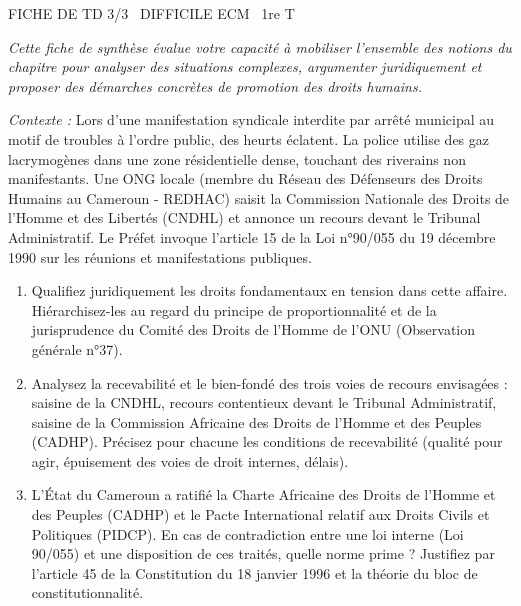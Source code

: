 \documentclass[11pt]{article}
\begin{document}
\begin{tcolorbox}[enhanced,colback=popink,colframe=popink,arc=10pt,boxrule=0pt,left=12pt,right=12pt,top=9pt,bottom=9pt]
{\color{white}\popxbold\small FICHE DE TD 3/3 \textbullet\ DIFFICILE \hfill ECM \textbullet\ 1re T\par}
\end{tcolorbox}
\vspace{4pt}
\noindent \textit{Cette fiche de synthèse évalue votre capacité à mobiliser l'ensemble des notions du chapitre pour analyser des situations complexes, argumenter juridiquement et proposer des démarches concrètes de promotion des droits humains.}

\begin{exercice}
    \textit{Contexte :} Lors d'une manifestation syndicale interdite par arrêté municipal au motif de troubles à l'ordre public, des heurts éclatent. La police utilise des gaz lacrymogènes dans une zone résidentielle dense, touchant des riverains non manifestants. Une ONG locale (membre du Réseau des Défenseurs des Droits Humains au Cameroun - REDHAC) saisit la Commission Nationale des Droits de l'Homme et des Libertés (CNDHL) et annonce un recours devant le Tribunal Administratif. Le Préfet invoque l'article 15 de la Loi n°90/055 du 19 décembre 1990 sur les réunions et manifestations publiques.
    \begin{enumerate}
        \item Qualifiez juridiquement les droits fondamentaux en tension dans cette affaire. Hiérarchisez-les au regard du principe de proportionnalité et de la jurisprudence du Comité des Droits de l'Homme de l'ONU (Observation générale n°37).
        \item Analysez la recevabilité et le bien-fondé des trois voies de recours envisagées : saisine de la CNDHL, recours contentieux devant le Tribunal Administratif, saisine de la Commission Africaine des Droits de l'Homme et des Peuples (CADHP). Précisez pour chacune les conditions de recevabilité (qualité pour agir, épuisement des voies de droit internes, délais).
        \item L'État du Cameroun a ratifié la Charte Africaine des Droits de l'Homme et des Peuples (CADHP) et le Pacte International relatif aux Droits Civils et Politiques (PIDCP). En cas de contradiction entre une loi interne (Loi 90/055) et une disposition de ces traités, quelle norme prime ? Justifiez par l'article 45 de la Constitution du 18 janvier 1996 et la théorie du bloc de constitutionnalité.
    \end{enumerate}
\end{exercice}
\end{document}
